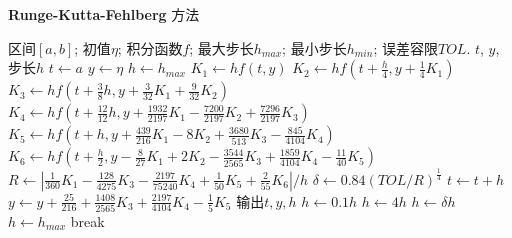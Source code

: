 \documentclass[UTF8,ctexart,a4paper,11pt,openany]{article}
\theoremstyle{definition}
\newcommand\e{\leftarrow}
\begin{document}
    \begin{algorithm}[H]
        \caption{\textbf{Runge-Kutta-Fehlberg} 方法}
        \begin{algorithmic}[1] %
            \Require 区间$[a,b]$; 初值$\eta $; 积分函数$f$; 最大步长$h_{max}$; 最小步长$h_{min}$; 误差容限$TOL$.
            \Ensure $t$, $y$, 步长$h$
                \State $t \e a$
                \State $y\e \eta$
                \State $h\e h_{max}$
                    \State $K_1\e hf\left(t, y\right)$
                    \State $K_2\e hf\left(t+\frac{h}{4}, y+\frac{1}{4}K_1\right)$
                    \State $K_3\e hf\left(t+\frac{3}{8}h, y+\frac{3}{32}K_1+\frac{9}{32}K_2\right)$
                    \State $K_4\e hf\left(t+\frac{12}{12}h, y+\frac{1932}{2197}K_1-\frac{7200}{2197}K_2+\frac{7296}{2197}K_3\right)$
                    \State $K_5\e hf\left(t+h, y+\frac{439}{216}K_1-8K_2+\frac{3680}{513}K_3-\frac{845}{4104}K_4\right)$
                    \State $K_6\e hf\left(t+\frac{h}{2}, y-\frac{8}{27}K_1+2K_2-\frac{3544}{2565}K_3+\frac{1859}{4104}K_4-\frac{11}{40}K_5\right)$
                    \State $R\e \left|\frac{1}{360}K_1-\frac{128}{4275}K_3-\frac{2197}{75240}K_4+\frac{1}{50}K_5+\frac{2}{55}K_6\right|/h$
                    \State $\delta \e 0.84(TOL/R)^{\frac{1}{4}}$
                        \State $t\e t+h$
                        \State $y\e y+\frac{25}{216}+\frac{1408}{2565}K_3+\frac{2197}{4104}K_4-\frac{1}{5}K_5$
                        \State 输出$t,y,h$
                    \EndIf
                        \State $h\e 0.1h$
                    \Else
                            \State $h\e 4h$
                        \Else 
                            \State $h\e \delta h$
                        \EndIf
                    \EndIf 
                        \State $h\e h_{max}$
                    \EndIf
                        \State break
                    \EndIf 
                \EndFor
            \EndFunction
        \end{algorithmic}
    \end{algorithm}
\end{document}
